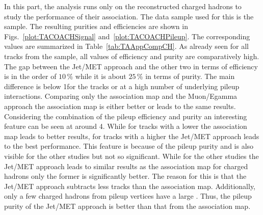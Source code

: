 In this part, the analysis runs only on the reconstructed charged hadrons to study the performance of their association. The data sample used for this is the \ttbar sample. The resulting purities and efficiencies are shown in Figs.~\ref{plot:TACOACHSignal} and~\ref{plot:TACOACHPileup}.  The corresponding values are summarized in Table~\ref{tab:TAAppCompCH}. As already seen for all tracks from the \ttbar sample, all values of efficiency and purity are comparatively high. The gap between the Jet/MET approach and the other two in terms of efficiency is in the order of $10\,\%$ while it is about $25\,\%$ in terms of purity. The main difference is below 1\GeV for the tracks \pt or at a high number of underlying pileup interactions. Comparing only the association map and the Muon/Egamma approach the association map is either better or leads to the same results. \\
Considering the combination of the pileup efficiency and purity an interesting feature can be seen at around 4\GeV{}. While for tracks with a lower \pt{} the association map leads to better results, for tracks with a higher \pt{} the Jet/MET approach leads to the best performance. This feature is because of the pileup purity and is also visible for the other studies but not so significant. While for the other studies the Jet/MET approach leads to similar results as the association map for charged hadrons only the former is significantly better. The reason for this is that the Jet/MET approach subtracts less tracks than the association map. Additionally, only a few charged hadrons from pileup vertices have a large \pt{}. Thus, the pileup purity of the Jet/MET approach is better than that from the association map.


